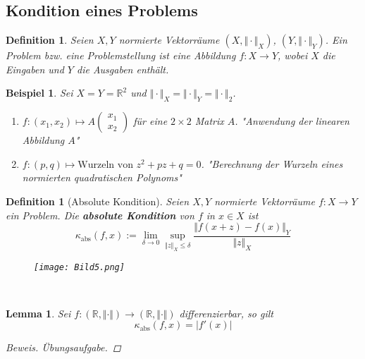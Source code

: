 \documentclass[12pt]{article}
\theoremstyle{break}
\newtheorem{lemma}[theorem]{Lemma}
\newtheorem{definition}[theorem]{Definition}
\newtheorem{example}[theorem]{Beispiel}
\begin{document}
\subsection{Kondition eines Problems}

\begin{definition}
Seien $X,Y$ normierte Vektorräume $(X, \Vert \cdot \Vert_X)$, $(Y, \Vert \cdot \Vert_Y)$. Ein Problem bzw. eine Problemstellung ist eine Abbildung $f\colon X \rightarrow Y$, wobei $X$ die Eingaben und $Y$ die Ausgaben enthält.
\end{definition}

\begin{example}
Sei $X = Y = \mathbb{R}^2$ und $\Vert \cdot \Vert_X = \Vert \cdot \Vert_Y = \Vert \cdot \Vert_2$.
\begin{enumerate}
  \item[i)] $f\colon (x_1, x_2) \mapsto A \left(\begin{matrix} x_1 \\x_2 \end{matrix} \right)$ für eine $2\times 2$ Matrix $A$. "Anwendung der linearen Abbildung $A$"
  \item[ii)] $f\colon (p,q) \mapsto \text{Wurzeln von $z^2 + pz + q = 0$}$. "Berechnung der Wurzeln eines normierten quadratischen Polynoms"
\end{enumerate}
\end{example}

\begin{definition}[Absolute Kondition]
Seien $X, Y$ normierte Vektorräume $f\colon X \rightarrow Y$ ein Problem. Die \textbf{absolute Kondition} von $f$ in $x \in X$ ist 
$$\kappa_{\text{abs}}(f,x) := \lim_{\delta \rightarrow 0} \sup_{\Vert z \Vert_X \leq \delta} \frac{\Vert f(x+z) - f(x) \Vert_Y}{\Vert z \Vert_X} $$
    \begin{figure}[!htb]
    \centering
    \texttt{[image: Bild5.png]}
    \end{figure}\\
\end{definition}

\begin{lemma}
Sei $f\colon (\mathbb{R}, \Vert \cdot \Vert) \rightarrow (\mathbb{R}, \Vert \cdot \Vert)$ differenzierbar, so gilt
$$\kappa_{\text{abs}}(f,x) = \vert f'(x) \vert$$
\begin{proof}[Beweis]
Übungsaufgabe.
\end{proof}
\end{lemma}
\end{document}
